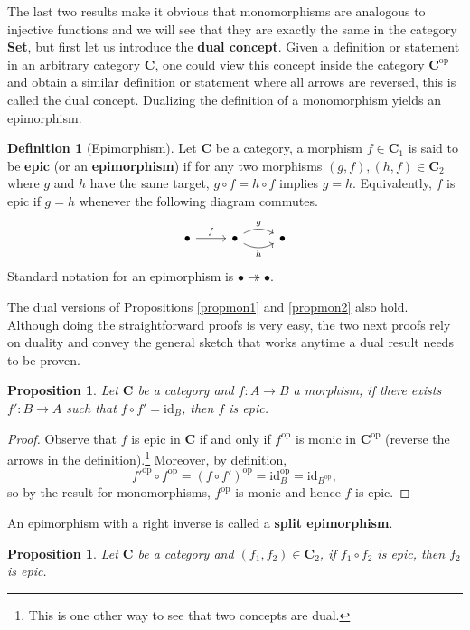 \documentclass{article}
\newtheorem{prop}[thm]{Proposition}
\theoremstyle{definition}
\newtheorem{defn}[thm]{Definition}
\theoremstyle{remark}
\newcommand{\id}{\text{id}}
\newcommand{\op}[1]{#1^{\text{op}}}
\begin{document}
The last two results make it obvious that monomorphisms are analogous to injective functions and we will see that they are exactly the same in the category \textbf{Set}, but first let us introduce the \textbf{dual concept}. Given a definition or statement in an arbitrary category $\mathbf{C}$, one could view this concept inside the category $\op{\mathbf{C}}$ and obtain a similar definition or statement where all arrows are reversed, this is called the dual concept. Dualizing the definition of a monomorphism yields an epimorphism.
\begin{defn}[Epimorphism]
	Let $\mathbf{C}$ be a category, a morphism $f \in \mathbf{C}_1$ is said to be \textbf{epic} (or an \textbf{epimorphism}) if for any two morphisms $(g,f), (h,f) \in \mathbf{C}_2$ where $g$ and $h$ have the same target, $g\circ f = h\circ f$ implies $g = h$. Equivalently, $f$ is epic if $g = h$ whenever the following diagram commutes.
	\begin{equation}
	\begin{tikzcd}
	\bullet \arrow[r, "f"] & \bullet \arrow[r, "g", bend left] \arrow[r, "h"', bend right] & \bullet
	\end{tikzcd}
	\end{equation}
	Standard notation for an epimorphism is $ \bullet \twoheadrightarrow \bullet$.
\end{defn}
The dual versions of Propositions \ref{propmon1} and \ref{propmon2} also hold. Although doing the straightforward proofs is very easy, the two next proofs rely on duality and convey the general sketch that works anytime a dual result needs to be proven.
\begin{prop}\label{propep1}
	Let $\mathbf{C}$ be a category and $f:A\rightarrow B$ a morphism, if there exists $f': B\rightarrow A$ such that $f\circ f' = \id_B$, then $f$ is epic.
\end{prop}
\begin{proof}
	Observe that $f$ is epic in $\mathbf{C}$ if and only if $\op{f}$ is monic in $\op{\mathbf{C}}$ (reverse the arrows in the definition).\footnote{This is one other way to see that two concepts are dual.} Moreover, by definition, \[\op{f'} \circ \op{f} = \op{(f \circ f')} = \op{\id_B} = \id_{\op{B}},\] so by the result for monomorphisms, $\op{f}$ is monic and hence $f$ is epic. 
\end{proof}
An epimorphism with a right inverse is called a \textbf{split epimorphism}.
\begin{prop}
	Let $\mathbf{C}$ be a category and $(f_1, f_2) \in \mathbf{C}_2$, if $f_1 \circ f_2$ is epic, then $f_2$ is epic.
\end{prop}
\end{document}
